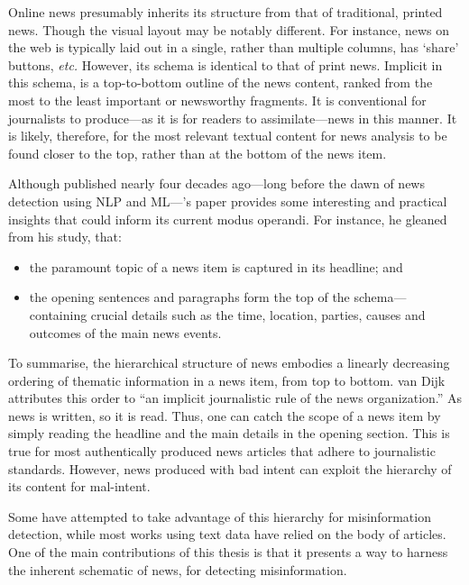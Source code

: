 Online news presumably inherits its structure from that of traditional, printed news. Though the visual layout may be notably different. For instance, news on the web is typically laid out in a single, rather than multiple columns, has `share' buttons, \emph{etc.} However, its schema is identical to that of print news. Implicit in this schema, is a top-to-bottom outline of the news content, ranked from the most to the least important or newsworthy fragments. It is conventional for journalists to produce—as it is for readers to assimilate—news in this manner. It is likely, therefore, for the most relevant textual content for news analysis to be found closer to the top, rather than at the bottom of the news item.

Although published nearly four decades ago—long before the dawn of news detection using \ac{NLP} and \ac{ML}—\citeauthor{Dijk:1983}'s paper provides some interesting and practical insights that could inform its current modus operandi. For instance, he gleaned from his study, that:

\begin{itemize}
    \item the paramount topic of a news item is captured in its headline; and
    \item the opening sentences and paragraphs form the top of the schema—containing crucial details such as the time, location, parties, causes and outcomes of the main news events.
\end{itemize}

To summarise, the hierarchical structure of news embodies a linearly decreasing ordering of thematic information in a news item, from top to bottom. van Dijk attributes this order to ``an implicit journalistic rule of the news organization.'' As news is written, so it is read. Thus, one can catch the scope of a news item by simply reading the headline and the main details in the opening section. This is true for most authentically produced news articles that adhere to journalistic standards. However, news produced with bad intent can exploit the hierarchy of its content for mal-intent.

Some have attempted to take advantage of this hierarchy for misinformation detection, while most works using text data have relied on the body of articles. One of the main contributions of this thesis is that it presents a way to harness the inherent schematic of news, for detecting misinformation.


